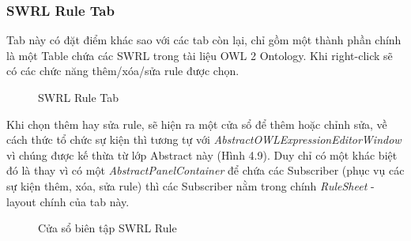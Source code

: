 \subsubsection{SWRL Rule Tab}
Tab này có đặt điểm khác sao với các tab còn lại, chỉ gồm một thành phần chính là một Table chứa các SWRL trong tài liệu OWL 2 Ontology. Khi right-click sẽ có các chức năng thêm/xóa/sửa rule được chọn.
\begin{figure}[h!]
	\centering
	\caption{SWRL Rule Tab\label{overflow}}
\end{figure}
Khi chọn thêm hay sửa rule, sẽ hiện ra một cửa sổ để thêm hoặc chỉnh sửa, về cách thức tổ chức sự kiện thì tương tự với \textit{AbstractOWLExpressionEditorWindow} vì chúng được kế thừa từ lớp Abstract này (Hình 4.9). Duy chỉ có một khác biệt đó là thay vì có một \textit{AbstractPanelContainer} để chứa các Subscriber (phục vụ các sự kiện thêm, xóa, sửa rule) thì các Subscriber nằm trong chính \textit{RuleSheet} - layout chính của tab này.
\begin{figure}[h!]
	\centering
	\caption{Cửa sổ biên tập SWRL Rule\label{overflow}}
\end{figure}
